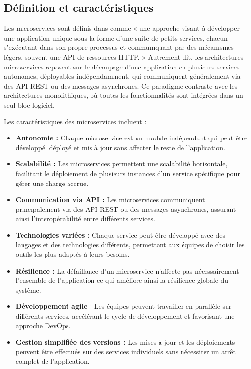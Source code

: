 \documentclass[a4paper,12pt]{report}
\begin{document}
\subsection{Définition et caractéristiques}
Les microservices sont définis dans \cite{lewis_fowler_2014} comme « une approche visant à développer une application unique sous la forme d'une suite de petits services, chacun s'exécutant dans son propre processus et communiquant par des mécanismes légers, souvent une API de ressources HTTP. » Autrement dit, les architectures microservices reposent sur le découpage d'une application en plusieurs services autonomes, déployables indépendamment, qui communiquent généralement via des API REST ou des messages asynchrones. Ce paradigme contraste avec les architectures monolithiques, où toutes les fonctionnalités sont intégrées dans un seul bloc logiciel.

Les caractéristiques des microservices incluent :

\begin{itemize}
  \item \textbf{Autonomie :} Chaque microservice est un module indépendant qui peut être développé, déployé et mis à jour sans affecter le reste de l'application.
  \item \textbf{Scalabilité :} Les microservices permettent une scalabilité horizontale, facilitant le déploiement de plusieurs instances d'un service spécifique pour gérer une charge accrue.
  \item \textbf{Communication via API :} Les microservices communiquent principalement via des API REST ou des messages asynchrones, assurant ainsi l'interopérabilité entre différents services.
  \item \textbf{Technologies variées :} Chaque service peut être développé avec des langages et des technologies différents, permettant aux équipes de choisir les outils les plus adaptés à leurs besoins.
  \item \textbf{Résilience :} La défaillance d'un microservice n'affecte pas nécessairement l'ensemble de l'application ce qui améliore ainsi la résilience globale du système.
  \item \textbf{Développement agile :} Les équipes peuvent travailler en parallèle sur différents services, accélérant le cycle de développement et favorisant une approche DevOps.
  \item \textbf{Gestion simplifiée des versions :} Les mises à jour et les déploiements peuvent être effectués sur des services individuels sans nécessiter un arrêt complet de l'application.
\end{itemize}
\end{document}
